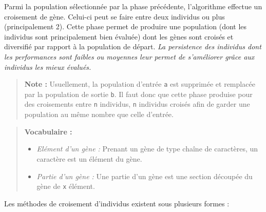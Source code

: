 Parmi la population sélectionnée par la phase précédente, l'algorithme
effectue un croisement de gène. Celui-ci peut se faire entre deux
individus ou plus (principalement 2). Cette phase permet de produire une
population (dont les individus sont principalement bien évaluée) dont
les gènes sont croisés et diversifié par rapport à la population de
départ. \emph{La persistence des individus dont les performances sont
faibles ou moyennes leur permet de s'améliorer grâce aux individus les
mieux évalués.}

\begin{quote}
\textbf{Note :} Usuellement, la population d'entrée \texttt{a} est
supprimée et remplacée par la population de sortie \texttt{b}. Il faut
donc que cette phase produise pour des croisements entre \texttt{n}
individus, \texttt{n} individus croisés afin de garder une population au
même nombre que celle d'entrée.
\end{quote}

\begin{quote}
\textbf{Vocabulaire :}

\begin{itemize}
\tightlist
\item
  \emph{Elément d'un gène :} Prenant un gène de type chaîne de
  caractères, un caractère est un élément du gène.
\item
  \emph{Partie d'un gène :} Une partie d'un gène est une section
  découpée du gène de \texttt{x} élément.
\end{itemize}
\end{quote}

Les méthodes de croisement d'individus existent sous plusieurs formes :

